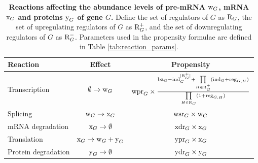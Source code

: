 
\begin{table}[ht]
	\caption{\textbf{Reactions affecting the abundance levels of pre-mRNA $\text{w}_{G}$, mRNA $\text{x}_{G}$ and proteins $\text{y}_{G}$ of gene $G$.} Define the set of regulators of $G$ as $\text{R}_{G}$, the set of upregulating regulators of $G$ as $\text{R}^+_{G}$, and the set of downregulating regulators of $G$ as $\text{R}^-_{G}$. Parameters used in the propensity formulae are defined in Table \ref{tab:reaction_params}.} \label{tab:reaction_def}
	\centering
	\begin{tabular}{|lcc|}
		\hline
		Reaction & Effect & Propensity \\ \hline \hline
		Transcription & $\emptyset \rightarrow \text{w}_{G}$ & $\text{wpr}_{G} \times \frac{\text{ba}_{G} - \text{ind}_{G}^{|\text{R}^+_{G}|} + \prod\limits_{H \in \text{R}^+_{G}}(\text{ind}_{G} + \text{reg}_{G,H})}{\prod\limits_{H \in \text{R}_{G}}(1 + \text{reg}_{G,H})}$ \\
		Splicing & $\text{w}_{G} \rightarrow \text{x}_{G}$ & $\text{wsr}_{G} \times \text{w}_{G}$ \\
		mRNA degradation & $\text{x}_{G} \rightarrow \emptyset$ & $\text{xdr}_{G} \times \text{x}_{G}$ \\
		Translation & $\text{x}_{G} \rightarrow \text{w}_{G} + \text{y}_{G}$ & $\text{ypr}_{G} \times \text{x}_{G}$ \\
		Protein degradation & $\text{y}_{G} \rightarrow \emptyset$ & $\text{ydr}_{G} \times \text{y}_{G}$ \\ \hline
	\end{tabular}
\end{table}



